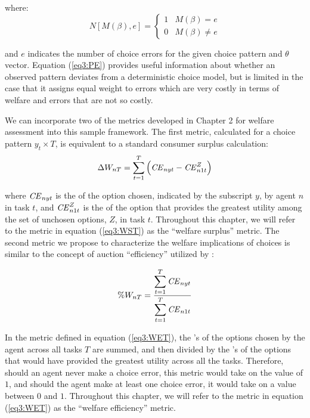 \documentclass[../main.tex]{subfiles}
\begin{document}
\addtocounter{footnote}{-1}

\noindent where:
\begin{equation}
	\label{eq3:NMB}
	N[M(\beta), e] = 
	\begin{cases}
		1 & M(\beta) = e\\
		0 & M(\beta) \neq e
	\end{cases}
\end{equation}

\noindent and $e$ indicates the number of choice errors for the given choice pattern and $\theta$ vector.
Equation (\ref{eq3:PE}) provides useful information about whether an observed pattern deviates from a deterministic choice model, but is limited in the case that it assigns equal weight to errors which are very costly in terms of welfare and errors that are not so costly.

We can incorporate two of the metrics developed in Chapter 2 for welfare assessment into this sample framework.
The first metric, calculated for a choice pattern $y_t \times T$, is equivalent to a standard consumer surplus calculation:
\begin{equation}
	\label{eq3:WST}
	\Delta W_{nT} = \sum_{t=1}^T \left( {\mathit{CE}}_{nyt} - {\mathit{CE}}_{n1t}^Z \right)
\end{equation}

\noindent where ${\mathit{CE}}_{nyt}$ is the {\CE} of the option chosen, indicated by the subscript $y$, by agent $n$ in task $t$, and ${\mathit{CE}}_{n1t}^Z$ is the {\CE} of the option that provides the greatest utility among the set of unchosen options, $Z$, in task $t$.
Throughout this chapter, we will refer to the metric in equation (\ref{eq3:WST}) as the \enquote{welfare surplus} metric.
The second metric we propose to characterize the welfare implications of choices is similar to the concept of auction \enquote{efficiency} utilized by \textcite{Plott1978}:

\begin{equation}
	\label{eq3:WET}
	\%W_{nT} = \frac{\displaystyle\sum_{t=1}^{T} {\mathit{CE}}_{nyt} }{\displaystyle\sum_{t=1}^{T} {\mathit{CE}}_{n1t}}
\end{equation}

\noindent In the metric defined in equation (\ref{eq3:WET}), the {\CE}'s of the options chosen by the agent across all tasks $T$ are summed, and then divided by the {\CE}'s of the options that would have provided the greatest utility across all the tasks.
Therefore, should an agent never make a choice error, this metric would take on the value of $1$, and should the agent make at least one choice error, it would take on a value between $0$ and $1$.{\footnotemark}
Throughout this chapter, we will refer to the metric in equation (\ref{eq3:WET}) as the \enquote{welfare efficiency} metric.
\end{document}
